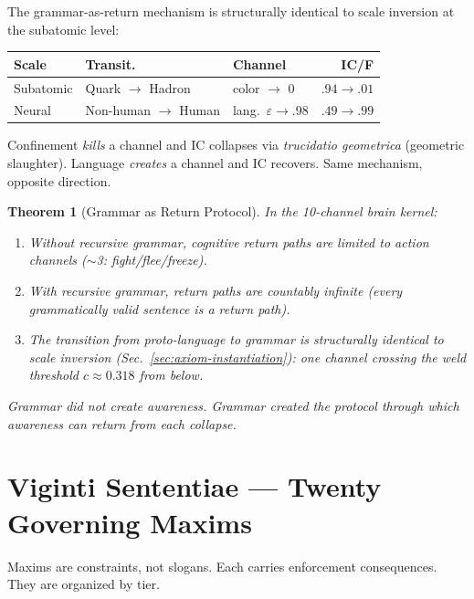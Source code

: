 \documentclass[
  aps,
  prd,
  twocolumn,
  superscriptaddress,
  nofootinbib,
  floatfix
]{revtex4-2}
\newtheorem{theorem}{Theorem}
\newcommand{\eps}{\varepsilon}
\newcommand{\lat}[1]{\textit{#1}}
\begin{document}
The grammar-as-return mechanism is structurally identical to
scale inversion at the subatomic level:

\begin{center}
\small
\begin{tabular}{@{}lP{1.2cm}P{1.3cm}r@{}}
\toprule
\textbf{Scale} & \textbf{Transit.} & \textbf{Channel} &
  \textbf{IC/F} \\
\midrule
Subatomic & Quark ${\to}$ Hadron & color ${\to}$ 0 &
  $.94 {\to} .01$ \\
Neural & Non-human ${\to}$ Human & lang.\ ${\eps}{\to}.98$ &
  $.49 {\to} .99$ \\
\bottomrule
\end{tabular}
\end{center}

\noindent
Confinement \emph{kills} a channel and IC collapses via
\lat{trucidatio geometrica} (geometric slaughter). Language
\emph{creates} a channel and IC recovers. Same mechanism,
opposite direction.

\begin{theorem}[Grammar as Return Protocol]\label{thm:grammar}
In the 10-channel brain kernel:
\begin{enumerate}[nosep,leftmargin=*]
  \item Without recursive grammar, cognitive return paths are
    limited to action channels ($\sim$3: fight/flee/freeze).
  \item With recursive grammar, return paths are countably
    infinite (every grammatically valid sentence is a return
    path).
  \item The transition from proto-language to grammar is
    structurally identical to scale inversion
    (Sec.~\ref{sec:axiom-instantiation}): one channel
    crossing the weld threshold $c \approx 0.318$ from below.
\end{enumerate}
Grammar did not create awareness. Grammar created the
\emph{protocol} through which awareness can return from each
collapse.
\end{theorem}

\section{Viginti Sententiae ---
  Twenty Governing Maxims}\label{sec:maxims}

\noindent
Maxims are constraints, not slogans. Each carries enforcement
consequences. They are organized by tier.
\end{document}
